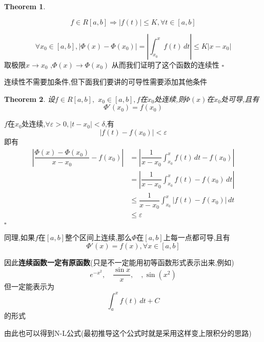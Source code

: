 \documentclass[11pt,hyperref,a4paper,UTF8]{ctexart}
\newtheorem{theorem}{Theorem}[subsection]
\newenvironment{cproof}{%
\heiti{证明}\kaishu
}{%
  \hfill $\square$
  \par\bigskip
}
\newcommand{\abs}[1]{\left|#1\right|}
\begin{document}
\begin{CJK}{UTF8}{gkai}
\begin{theorem}
\end{theorem}
\begin{cproof}
\[f\in R[a,b]\Rightarrow \abs{f(t)} \leq K,\forall t\in [a,b]\]

\[\forall x_0 \in [a,b], \abs{\varPhi(x) - \varPhi(x_0)} = \abs{\int_{x_0}^{x} f(t)\,dt}
\leq K|x - x_0|\]
取极限$x\to x_0$ ,$\varPhi(x) \to \varPhi(x_0)$
从而我们证明了这个函数的连续性
\end{cproof}
连续性不需要加条件,但下面我们要讲的可导性需要添加其他条件

\begin{theorem}
设$f\in R[a,b],$ $x_0\in [a,b],f$在$x_0$处连续,则$\varPhi(x)$在$x_0$处可导,且有
\[\varPhi'(x_0) = f(x_0)\]
\end{theorem}

\begin{cproof}
  $f$在$x_0$处连续,$\forall \varepsilon > 0,|t - x_0| <\delta$,有
  \[|f(t) - f(x_0)|< \varepsilon\]
  即有
  \[
  \begin{aligned}  
  \abs{\dfrac{\varPhi(x) - \varPhi(x_0)}{x - x_0} - f(x_0)} &= \abs{\dfrac{1}{x - x_0} \int_{x_0}^{x}f(t)\,dt - f(x_0)}\\
  &= \abs{\dfrac{1}{x - x_0} \int_{x_0}^{x}f(t)- f(x_0)\,dt}\\ 
  &\leq \dfrac{1}{x - x_0} \int_{x_0}^{x}\abs{f(t)- f(x_0)}\,dt\\
  &\leq \varepsilon\\
  \end{aligned}
  \]
\end{cproof}

同理,如果$f$在$[a,b]$整个区间上连续,那么$\varPhi$在$[a,b]$上每一点都可导,且有
\[\varPhi'(x) = f(x),\forall x\in[a,b]\]

因此\textbf{连续函数一定有原函数}(只是不一定能用初等函数形式表示出来,例如)\\
\[e^{-x^2},\quad\dfrac{\sin x}{x},\quad,\sin (x^2)\]
但一定能表示为
\[\int_{a}^{x}f(t)\, dt + C\]
的形式

由此也可以得到N-L公式(最初推导这个公式时就是采用这样变上限积分的思路)


\end{CJK}
\end{document}
